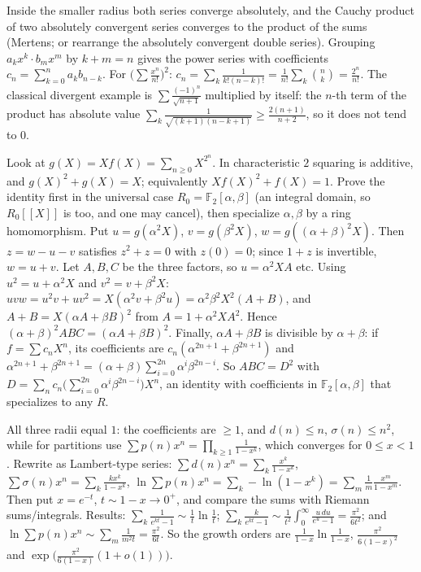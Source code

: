 \documentclass[11pt,a4paper]{article}
\begin{document}

Inside the smaller radius both series converge absolutely, and the Cauchy product of two absolutely convergent series converges to the product of the sums (Mertens; or rearrange the absolutely convergent double series). Grouping \(a_kx^k\cdot b_mx^m\) by \(k+m=n\) gives the power series with coefficients \(c_n=\sum_{k=0}^na_kb_{n-k}\).
For \(\bigl(\sum\frac{x^n}{n!}\bigr)^2\): \(c_n=\sum_k\frac1{k!(n-k)!}=\frac1{n!}\sum_k\binom nk=\frac{2^n}{n!}\). The classical divergent example is \(\sum\frac{(-1)^n}{\sqrt{n+1}}\) multiplied by itself: the \(n\)-th term of the product has absolute value \(\sum_{k}\frac1{\sqrt{(k+1)(n-k+1)}}\ge\frac{2(n+1)}{n+2}\), so it does not tend to \(0\).

Look at \(g(X)=Xf(X)=\sum_{n\ge0}X^{2^n}\). In characteristic \(2\) squaring is additive, and \(g(X)^2+g(X)=X\); equivalently \(Xf(X)^2+f(X)=1\).
Prove the identity first in the universal case \(R_0=\mathbb F_2[\alpha,\beta]\) (an integral domain, so \(R_0[[X]]\) is too, and one may cancel), then specialize \(\alpha,\beta\) by a ring homomorphism. Put \(u=g(\alpha^2X)\), \(v=g(\beta^2X)\), \(w=g((\alpha+\beta)^2X)\). Then \(z=w-u-v\) satisfies \(z^2+z=0\) with \(z(0)=0\); since \(1+z\) is invertible, \(w=u+v\).
Let \(A,B,C\) be the three factors, so \(u=\alpha^2XA\) etc. Using \(u^2=u+\alpha^2X\) and \(v^2=v+\beta^2X\): \(uvw=u^2v+uv^2=X(\alpha^2v+\beta^2u)=\alpha^2\beta^2X^2(A+B)\), and \(A+B=X(\alpha A+\beta B)^2\) from \(A=1+\alpha^2XA^2\). Hence \((\alpha+\beta)^2ABC=(\alpha A+\beta B)^2\).
Finally, \(\alpha A+\beta B\) is divisible by \(\alpha+\beta\): if \(f=\sum c_nX^n\), its coefficients are \(c_n(\alpha^{2n+1}+\beta^{2n+1})\) and \(\alpha^{2n+1}+\beta^{2n+1}=(\alpha+\beta)\sum_{i=0}^{2n}\alpha^i\beta^{2n-i}\). So \(ABC=D^2\) with \(D=\sum_nc_n\bigl(\sum_{i=0}^{2n}\alpha^i\beta^{2n-i}\bigr)X^n\), an identity with coefficients in \(\mathbb F_2[\alpha,\beta]\) that specializes to any \(R\).

All three radii equal \(1\): the coefficients are \(\ge1\), and \(d(n)\le n\), \(\sigma(n)\le n^2\), while for partitions use \(\sum p(n)x^n=\prod_{k\ge1}\frac1{1-x^k}\), which converges for \(0\le x\lt1\).
Rewrite as Lambert-type series: \(\sum d(n)x^n=\sum_k\frac{x^k}{1-x^k}\), \(\sum\sigma(n)x^n=\sum_k\frac{kx^k}{1-x^k}\), \(\ln\sum p(n)x^n=\sum_k-\ln(1-x^k)=\sum_m\frac1m\frac{x^m}{1-x^m}\). Then put \(x=e^{-t}\), \(t\sim1-x\to0^+\), and compare the sums with Riemann sums/integrals.
Results: \(\sum_k\frac1{e^{kt}-1}\sim\frac1t\ln\frac1t\); \(\sum_k\frac k{e^{kt}-1}\sim\frac1{t^2}\int_0^\infty\frac{u\,du}{e^u-1}=\frac{\pi^2}{6t^2}\); and \(\ln\sum p(n)x^n\sim\sum_m\frac1{m^2t}=\frac{\pi^2}{6t}\). So the growth orders are \(\frac1{1-x}\ln\frac1{1-x}\), \(\frac{\pi^2}{6(1-x)^2}\) and \(\exp\bigl(\frac{\pi^2}{6(1-x)}(1+o(1))\bigr)\).
\end{document}
